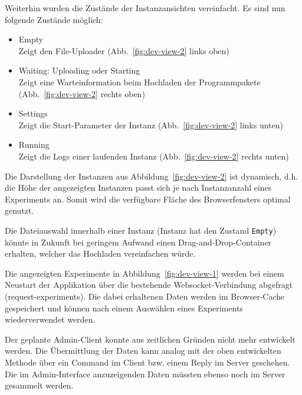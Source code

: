 Weiterhin wurden die Zustände der Instanzansichten vereinfacht. Es sind nun folgende Zustände möglich:
\begin{itemize}
  \item Empty
    \\ Zeigt den File-Uploader
    (Abb.~\ref{fig:dev-view-2} links oben)
  \item Waiting: Uploading oder Starting
    \\ Zeigt eine Warteinformation beim Hochladen der Programmpakete
    (Abb.~\ref{fig:dev-view-2} rechts oben)
  \item Settings
    \\ Zeigt die Start-Parameter der Instanz
    (Abb.~\ref{fig:dev-view-2} links unten)
  \item Running
    \\ Zeigt die Logs einer laufenden Instanz
    (Abb.~\ref{fig:dev-view-2} rechts unten)
\end{itemize}
Die Darstellung der Instanzen aus Abbildung~\ref{fig:dev-view-2} ist dynamisch, d.h. die Höhe der angezeigten Instanzen passt sich je nach Instanzanzahl eines Experiments an.
Somit wird die verfügbare Fläche des Browserfensters optimal genutzt.
\par
Die Dateiauswahl innerhalb einer Instanz (Instanz hat den Zustand \texttt{Empty}) könnte in Zukunft bei geringem Aufwand einen Drag-and-Drop-Container erhalten, welcher das Hochladen vereinfachen würde. 
\par Die angezeigten Experimente in Abbildung~\ref{fig:dev-view-1} werden bei einem Neustart der Applikation über die bestehende Websocket-Verbindung abgefragt (request-experiments).
Die dabei erhaltenen Daten werden im Browser-Cache gespeichert und können nach einem Auswählen eines Experiments wiederverwendet werden.
\par
Der geplante Admin-Client konnte aus zeitlichen Gründen nicht mehr entwickelt werden.
Die Übermittlung der Daten kann analog mit der oben entwickelten Methode über ein Command im Client bzw. einem Reply im Server geschehen.
Die im Admin-Interface anzuzeigenden Daten müssten ebenso noch im Server gesammelt werden.
\clearpage

